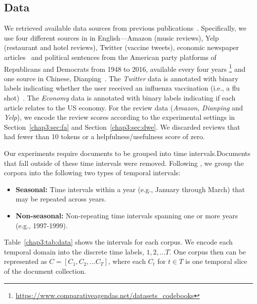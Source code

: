 \subsection{Data}
We retrieved available data sources from previous publications~\cite{zhang2014explicit, he2016ups, huang2018examining}. Specifically, we use four different sources in in English---Amazon (music reviews), Yelp (restaurant and hotel reviews), Twitter (vaccine tweets), economic newspaper articles~\cite{figure_eight_2015} and political sentences from the American party platforms of Republicans and Democrats from 1948 to 2016, available every four years \footnote{\url{https://www.comparativeagendas.net/datasets_codebooks}} and one source in Chinese, Dianping~\cite{meituan-dianping_2019}.
The \textit{Twitter} data is annotated with binary labels indicating whether the user received an influenza vaccination (i.e., a flu shot)~\cite{huang2017examining}.
The \textit{Economy} data is annotated with binary labels indicating if each article relates to the US economy. 
For the review data (\textit{Amazon, Dianping} and \textit{Yelp}), we encode the review scores according to the experimental settings in Section~\ref{chap3:sec:fa} and Section~\ref{chap3:sec:dwe}. We discarded reviews that had fewer than 10 tokens or a helpfulness/usefulness score of zero. 

Our experiments require documents to be grouped into time intervals.Documents that fall outside of these time intervals were removed. Following \cite{huang2018examining}, we group the corpora into the following two types of temporal intervals:

\begin{itemize}[leftmargin=*,itemsep=0ex]
\item {\bf Seasonal:} Time intervals within a year (e.g., January through March) that may be repeated across years.
\item {\bf Non-seasonal:} Non-repeating time intervals spanning one or more years (e.g., 1997-1999).
\end{itemize}

Table~\ref{chap3:tab:data} shows the intervals for each corpus. 
We encode each temporal domain into the discrete time labels, $1, 2, ...T$. One corpus then can be represented as $C = [C_1, C_2, ...C_T]$, where each $C_t$ for $t\in T$ is one temporal slice of the document collection.


